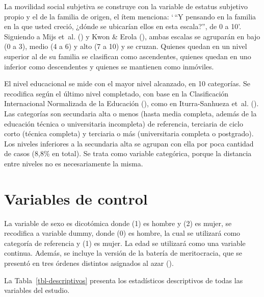 \documentclass[
  spanish,
  a4paper,
  oneside]{scrbook}
\begin{document}
La movilidad social subjetiva se construye con la variable de estatus
subjetivo propio y el de la familia de origen, el ítem menciona: `\,``Y
pensando en la familia en la que usted creció, ¿dónde se ubicarían ellos
en esta escala?'', de 0 a 10'. Siguiendo a Mijs et~al.
() y Kwon \& Erola
(), ambas escalas se
agruparán en bajo (0 a 3), medio (4 a 6) y alto (7 a 10) y se cruzan.
Quienes quedan en un nivel superior al de su familia se clasifican como
ascendentes, quienes quedan en uno inferior como descendentes y quienes
se mantienen como inmóviles.

El nivel educacional se mide con el mayor nivel alcanzado, en 10
categorías. Se recodifica según el último nivel completado, con base en
la Clasificación Internacional Normalizada de la Educación
(), como en Iturra-Sanhueza et~al.
(). Las categorías son
secundaria alta o menos (hasta media completa, además de la educación
técnica o universitaria incompleta) de referencia, terciaria de ciclo
corto (técnica completa) y terciaria o más (universitaria completa o
postgrado). Los niveles inferiores a la secundaria alta se agrupan con
ella por poca cantidad de casos (8,8\% en total). Se trata como variable
categórica, porque la distancia entre niveles no es necesariamente la
misma.

\section{Variables de control}\label{variables-de-control-2}

La variable de sexo es dicotómica donde (1) es hombre y (2) es mujer, se
recodifica a variable dummy, donde (0) es hombre, la cual se utilizará
como categoría de referencia y (1) es mujer. La edad se utilizará como
una variable continua. Además, se incluye la versión de la batería de
meritocracia, que se presentó en tres órdenes distintos asignados al
azar
().

La Tabla~\ref{tbl-descriptivos} presenta los estadísticos descriptivos
de todas las variables del estudio.
\end{document}

